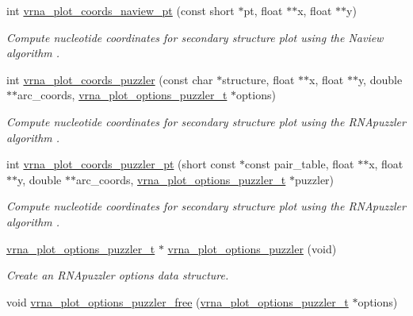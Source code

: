 \begin{DoxyCompactItemize}
int \mbox{\hyperlink{group__plot__layout__utils_gaa5089debe89c11e301dea04b3236efe3}{vrna\+\_\+plot\+\_\+coords\+\_\+naview\+\_\+pt}} (const short $\ast$pt, float $\ast$$\ast$x, float $\ast$$\ast$y)
\begin{DoxyCompactList}\small\item\em Compute nucleotide coordinates for secondary structure plot using the {\itshape Naview} algorithm \cite{bruccoleri:1988}. \end{DoxyCompactList}\item 
int \mbox{\hyperlink{group__plot__layout__utils_gafd49896df8780c9669125429bc0da9b3}{vrna\+\_\+plot\+\_\+coords\+\_\+puzzler}} (const char $\ast$structure, float $\ast$$\ast$x, float $\ast$$\ast$y, double $\ast$$\ast$arc\+\_\+coords, \mbox{\hyperlink{group__plot__layout__utils_structvrna__plot__options__puzzler__t}{vrna\+\_\+plot\+\_\+options\+\_\+puzzler\+\_\+t}} $\ast$options)
\begin{DoxyCompactList}\small\item\em Compute nucleotide coordinates for secondary structure plot using the {\itshape R\+N\+Apuzzler} algorithm \cite{wiegreffe:2018}. \end{DoxyCompactList}\item 
int \mbox{\hyperlink{group__plot__layout__utils_gab50a90dd6000a1920d741537af7e0b24}{vrna\+\_\+plot\+\_\+coords\+\_\+puzzler\+\_\+pt}} (short const $\ast$const pair\+\_\+table, float $\ast$$\ast$x, float $\ast$$\ast$y, double $\ast$$\ast$arc\+\_\+coords, \mbox{\hyperlink{group__plot__layout__utils_structvrna__plot__options__puzzler__t}{vrna\+\_\+plot\+\_\+options\+\_\+puzzler\+\_\+t}} $\ast$puzzler)
\begin{DoxyCompactList}\small\item\em Compute nucleotide coordinates for secondary structure plot using the {\itshape R\+N\+Apuzzler} algorithm \cite{wiegreffe:2018}. \end{DoxyCompactList}\item 
\mbox{\hyperlink{group__plot__layout__utils_structvrna__plot__options__puzzler__t}{vrna\+\_\+plot\+\_\+options\+\_\+puzzler\+\_\+t}} $\ast$ \mbox{\hyperlink{group__plot__layout__utils_ga838ff131d5430461d0c4c41c4aba45bc}{vrna\+\_\+plot\+\_\+options\+\_\+puzzler}} (void)
\begin{DoxyCompactList}\small\item\em Create an R\+N\+Apuzzler options data structure. \end{DoxyCompactList}\item 
void \mbox{\hyperlink{group__plot__layout__utils_ga551344268c4245f3f75994a51c517a30}{vrna\+\_\+plot\+\_\+options\+\_\+puzzler\+\_\+free}} (\mbox{\hyperlink{group__plot__layout__utils_structvrna__plot__options__puzzler__t}{vrna\+\_\+plot\+\_\+options\+\_\+puzzler\+\_\+t}} $\ast$options)

\end{DoxyCompactItemize}

